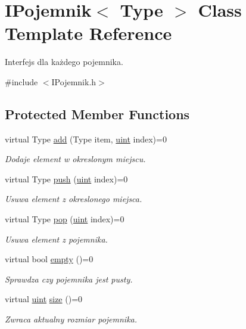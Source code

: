 \hypertarget{class_i_pojemnik}{\section{I\-Pojemnik$<$ Type $>$ Class Template Reference}
\label{class_i_pojemnik}
}


Interfejs dla każdego pojemnika.  




{\ttfamily \#include $<$I\-Pojemnik.\-h$>$}

\subsection*{Protected Member Functions}
\begin{DoxyCompactItemize}
\item 
virtual Type \hyperlink{class_i_pojemnik_af344e1b83a85b421d97d4beccaa30322}{add} (Type item, \hyperlink{_i_lista_8h_a91ad9478d81a7aaf2593e8d9c3d06a14}{uint} index)=0
\begin{DoxyCompactList}\small\item\em Dodaje element w okreslonym miejscu. \end{DoxyCompactList}\item 
virtual Type \hyperlink{class_i_pojemnik_a95392ac62ce9417322986f870dd96191}{push} (\hyperlink{_i_lista_8h_a91ad9478d81a7aaf2593e8d9c3d06a14}{uint} index)=0
\begin{DoxyCompactList}\small\item\em Usuwa element z okreslonego miejsca. \end{DoxyCompactList}\item 
virtual Type \hyperlink{class_i_pojemnik_a699a1e80c731e602e8418f37c4707b96}{pop} (\hyperlink{_i_lista_8h_a91ad9478d81a7aaf2593e8d9c3d06a14}{uint} index)=0
\begin{DoxyCompactList}\small\item\em Usuwa element z pojemnika. \end{DoxyCompactList}\item 
virtual bool \hyperlink{class_i_pojemnik_ab4b01fcf2b3efc085722443dc083e1dc}{empty} ()=0
\begin{DoxyCompactList}\small\item\em Sprawdza czy pojemnika jest pusty. \end{DoxyCompactList}\item 
virtual \hyperlink{_i_lista_8h_a91ad9478d81a7aaf2593e8d9c3d06a14}{uint} \hyperlink{class_i_pojemnik_aed43b8d3b8114ce213eb182e80e35627}{size} ()=0
\begin{DoxyCompactList}\small\item\em Zwraca aktualny rozmiar pojemnika. \end{DoxyCompactList}\end{DoxyCompactItemize}


